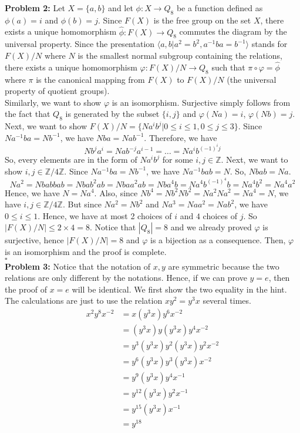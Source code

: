 \documentclass[12pt]{amsart}
\newcommand{\Z}{\mathbb{Z}}
\begin{document}
\textbf{Problem 2:}  Let $X=\{a,b\}$ and let $\phi: X\rightarrow Q_8$ be a function defined as $\phi(a)=i $ and $\phi(b)=j$. Since $F(X)$ is the free group on the set $X$, there exists a unique homomorphism $\hat{\phi}: F(X)\rightarrow Q_8$ commutes the diagram by the universal property. Since the presentation $\langle a,b|a^2=b^2,a^{-1}ba=b^{-1}\rangle $ stands for $F(X)/N$ where $N$ is the smallest normal subgroup containing the relations, there exists a unique homomorphism $\varphi:F(X)/N \to Q_8$ such that $\pi\circ \varphi =\hat{\phi}$ where $\pi$ is the canonical mapping from $F(X)$ to $F(X)/N$ (the universal property of quotient groups).\\
Similarly, we want to show $\varphi$ is an isomorphism. Surjective simply follows from the fact that $Q_8$ is generated by the subset $\{i,j\}$ and $\varphi(Na)=i$, $\varphi(Nb)=j$.\\
Next, we want to show $F(X)/N=\{Na^ib^j|0\leq i\leq 1,0\leq j\leq 3\}$. Since $Na^{-1}ba=Nb^{-1}$, we have $Nba=Nab^{-1}$. Therefore, we have 
\[Nb^ja^i=Nab^{-j}a^{i-1}=\dots=Na^ib^{(-1)^ij}\]
So, every elements are in the form of $Na^ib^j$ for some $i,j\in \Z$. Next, we want to show $i,j\in\Z/4\Z$. Since $Na^{-1}ba=Nb^{-1}$, we have $Na^{-1}bab=N$. So, $Nbab=Na$.
\[Na^2=Nbabbab=Nbab^2ab=Nbaa^2ab=Nba^4b=Na^4b^{(-1)^4}b=Na^4b^2=Na^4a^2\]
Hence, we have $N=Na^4$. Also, since $Nb^4=Nb^2Nb^2=Na^2Na^2=Na^4=N$, we have $i,j\in\Z/4\Z$. But since $Na^2=Nb^2$ and $Na^3=Naa^2=Nab^2$, we have $0\leq i \leq 1$. Hence, we have at most 2 choices of $i$ and $4$ choices of $j$. So $|F(X)/N|\leq 2\times 4=8$. Notice that $|Q_8|=8$ and we already proved $\varphi$ is surjective, hence $|F(X)/N|=8$ and $\varphi$ is a bijection as a consequence. Then, $\varphi$ is an isomorphism and the proof is complete.
\\\phantom{qed}\hfill$\square$\\
\textbf{Problem 3:} Notice that the notation of $x,y$ are symmetric because the two relations are only different by the notations. Hence, if we can prove $y=e$, then the proof of $x=e$ will be identical. We first show the two equality in the hint. The calculations are just to use the relation $xy^2=y^3x$ several times.
\begin{align*}
    x^2y^8x^{-2}&=x(y^3x)y^6x^{-2}\\
    &=(y^3x)y(y^3x)y^4x^{-2}\\
    &=y^3(y^3x)y^2(y^3x)y^2x^{-2}\\
    &=y^6(y^3x)y^3(y^3x)x^{-2}\\
    &=y^9(y^3x)y^4x^{-1}\\
    &=y^{12}(y^3x)y^2x^{-1}\\
    &=y^{15}(y^3x)x^{-1}\\
    &=y^{18}
\end{align*}
\end{document}
